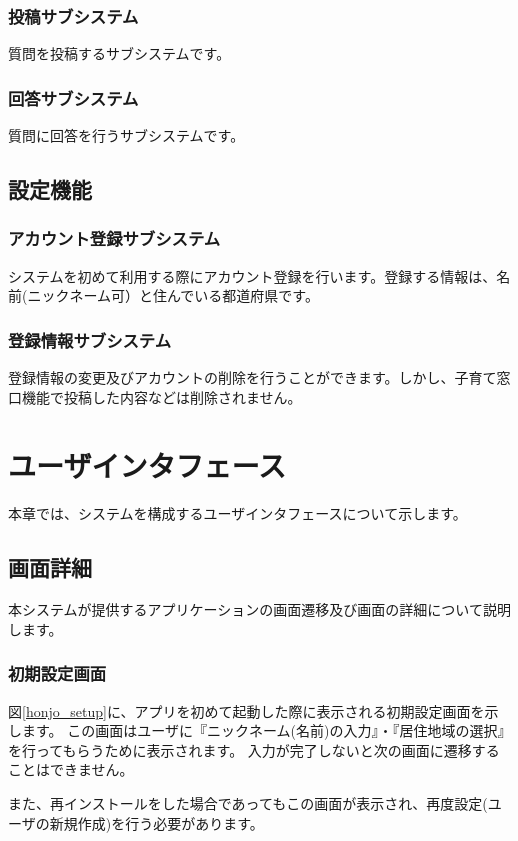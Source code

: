 \documentclass[a4j]{jarticle}
\begin{document}
\subsubsection*{投稿サブシステム}
質問を投稿するサブシステムです。
\subsubsection*{回答サブシステム}
質問に回答を行うサブシステムです。

\subsection{設定機能}
\subsubsection*{アカウント登録サブシステム}
システムを初めて利用する際にアカウント登録を行います。登録する情報は、名前(ニックネーム可）と住んでいる都道府県です。
\subsubsection*{登録情報サブシステム}
登録情報の変更及びアカウントの削除を行うことができます。しかし、子育て窓口機能で投稿した内容などは削除されません。



\newpage
\section{ユーザインタフェース}
本章では、システムを構成するユーザインタフェースについて示します。

\subsection{画面詳細}
本システムが提供するアプリケーションの画面遷移及び画面の詳細について説明します。
\subsubsection{初期設定画面}
図\ref{honjo_setup}に、アプリを初めて起動した際に表示される初期設定画面を示します。
この画面はユーザに『ニックネーム(名前)の入力』・『居住地域の選択』を行ってもらうために表示されます。
入力が完了しないと次の画面に遷移することはできません。

また、再インストールをした場合であってもこの画面が表示され、再度設定(ユーザの新規作成)を行う必要があります。
\end{document}
